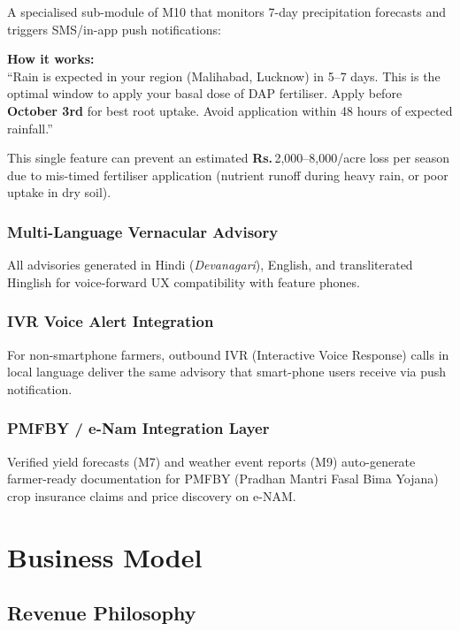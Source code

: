 \documentclass[12pt,a4paper]{article}
\newcommand{\Rup}{\textbf{Rs.\,}}
\begin{document}
A specialised sub-module of M10 that monitors 7-day precipitation forecasts and triggers SMS/in-app push notifications:

\begin{statbox}
\textbf{How it works:}\\
``Rain is expected in your region (Malihabad, Lucknow) in 5--7 days. This is the optimal window to apply your basal dose of DAP fertiliser. Apply before \textbf{October 3rd} for best root uptake. Avoid application within 48 hours of expected rainfall.''
\end{statbox}

This single feature can prevent an estimated \Rup 2,000--8,000/acre loss per season due to mis-timed fertiliser application (nutrient runoff during heavy rain, or poor uptake in dry soil).

\subsubsection{Multi-Language Vernacular Advisory}
All advisories generated in Hindi (\textit{Devanagari}), English, and transliterated Hinglish for voice-forward UX compatibility with feature phones.

\subsubsection{IVR Voice Alert Integration}
For non-smartphone farmers, outbound IVR (Interactive Voice Response) calls in local language deliver the same advisory that smart-phone users receive via push notification.

\subsubsection{PMFBY / e-Nam Integration Layer}
Verified yield forecasts (M7) and weather event reports (M9) auto-generate farmer-ready documentation for PMFBY (Pradhan Mantri Fasal Bima Yojana) crop insurance claims and price discovery on e-NAM.

\section{Business Model}

\subsection{Revenue Philosophy}
\end{document}

